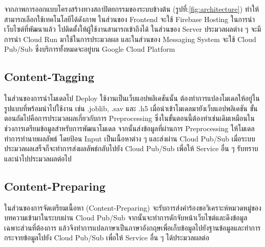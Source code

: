\documentclass[12pt,oneside,openright,a4paper]{cpe-thai-project}
\begin{document}
\begin{itemize}
  \hspace{1cm}จากภาพการออกแบบโครงสร้างทางสถาปัตยกรรมของระบบข้างต้น (รูปที่:\ref{fig:architecture}) ทำให้สามารถเลือกใช้เทคโนโลยีได้ดังภาพ ในส่วนของ Frontend จะใช้ Firebase Hosting 
  ในการนำเว็บไซต์ที่พัฒนาแล้ว ไปติดตั้งให้ผู้ใช้งานสามารถเข้าถึงได้ ในส่วนของ Server ประมวลผลต่าง ๆ จะมีการนำ Cloud Run มาใช้ในการประมวลผล 
  และในส่วนของ Messaging System จะใช้ Cloud Pub/Sub ซึ่งบริการทั้งหมดจะอยู่บน Google Cloud Platform 

\subsection{Content-Tagging}
  \hspace{1cm}ในส่วนของการนำโมเดลไป Deploy ใช้งานเป็นเว็บแอปพลิเคชันนั้น ต้องทำการแปลงโมเดลให้อยู่ในรูปแบบที่พร้อมนำไปใช้งาน 
  เช่น .joblib, .sav และ .h5 เมื่อนำเข้าโมเดลมายังเว็บแอปพลิเคชัน ขั้นตอนถัดไปคือการประมวลผลเกี่ยวกับการ Preprocessing 
  ซึ่งในขั้นตอนนี้ต้องทำเช่นเดิมเหมือนในช่วงการเตรียมข้อมูลสำหรับการพัฒนาโมเดล จากนั้นส่งข้อมูลที่ผ่านการ Preprocessing ให้โมเดลทำการทำนายผลลัพธ์ 
  โดยป้อน Input เป็นเนื้อหาต่าง ๆ และส่งผ่าน Cloud Pub/Sub เมื่อระบบประมวลผลเสร็จก็จะทำการส่งผลลัพธ์กลับไปยัง Cloud Pub/Sub 
  เพื่อให้ Service อื่น ๆ รับทราบและนำไปประมวลผลต่อไป

\subsection{Content-Preparing}
  \hspace{1cm}ในส่วนของการจัดเตรียมเนื้อหา (Content-Preparing) จะรับการส่งคำร้องขอวิเคราะห์หมวดหมู่ของบทความเข้ามาในระบบผ่าน Cloud Pub/Sub 
  จากนั้นจะทำการดักจับหน้าเว็บไซต์และดึงข้อมูลเฉพาะส่วนที่ต้องการ แล้วจึงทำการแปลภาษาเป็นภาษาอังกฤษเพื่อเก็บข้อมูลไปยังฐานข้อมูลและทำการกระจายข้อมูลไปยัง 
  Cloud Pub/Sub เพื่อให้ Service อื่น ๆ ได้ประมวลผลต่อ
\newpage

\end{itemize}
\end{document}
